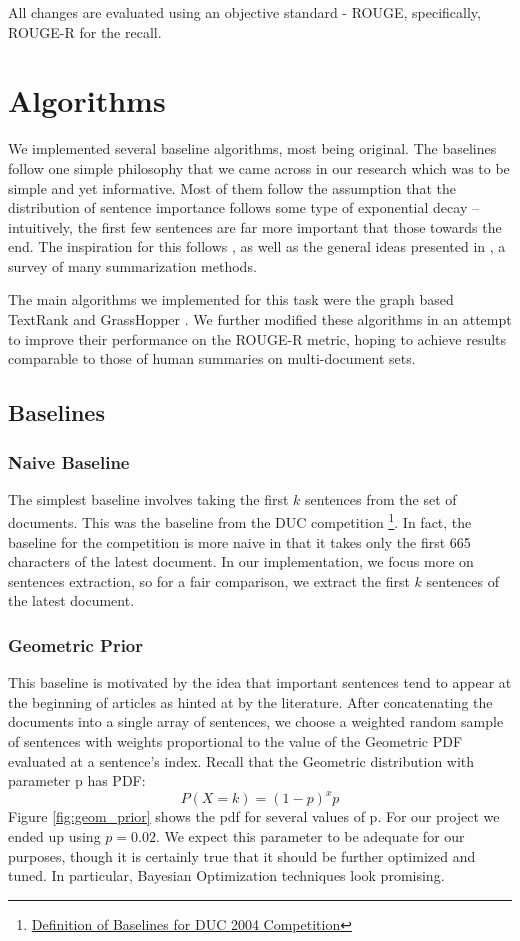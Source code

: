\documentclass[11pt]{article}
\begin{document}
All changes are evaluated using an objective standard - ROUGE, specifically, ROUGE-R for the recall.

\section{Algorithms}
We implemented several baseline algorithms, most being original. The baselines follow one simple philosophy that we came across in our research which was to be simple and yet informative. Most of them follow the assumption that the distribution of sentence importance follows some type of exponential decay -- intuitively, the first few sentences are far more important that those towards the end. The inspiration for this follows \cite{hmm_summary}, as well as the general ideas presented in \cite{survey}, a survey of many summarization methods.

The main algorithms we implemented for this task were the graph based TextRank \cite{textrank} and GrassHopper \cite{grasshopper}. We further modified these algorithms in an attempt to improve their performance on the ROUGE-R metric, hoping to achieve results comparable to those of human summaries on multi-document sets.

\subsection{Baselines}
\subsubsection{Naive Baseline}
The simplest baseline involves taking the first $k$ sentences from the set of documents. This was the baseline from the DUC competition \footnote{\href{http://duc.nist.gov/duc2004/baseline_definitions}{Definition of Baselines for DUC 2004 Competition}}. In fact, the baseline for the competition is more naive in that it takes only the first 665 characters of the latest document. In our implementation, we focus more on sentences extraction, so for a fair comparison, we extract the first $k$ sentences of the latest document.

\subsubsection{Geometric Prior}
This baseline is motivated by the idea that important sentences tend to appear at the beginning of articles as hinted at by the literature. After concatenating the documents into a single array of sentences, we choose a weighted random sample of sentences with weights proportional to the value of the Geometric PDF evaluated at a sentence's index. Recall that the Geometric distribution with parameter p has PDF:
$$ P(X = k) = (1- p)^x p$$
Figure \ref{fig:geom_prior} shows the pdf for several values of p. For our project we ended up using $p = 0.02$. We expect this parameter to be adequate for our purposes, though it is certainly true that it should be further optimized and tuned. In particular, Bayesian Optimization techniques look promising.
\end{document}
